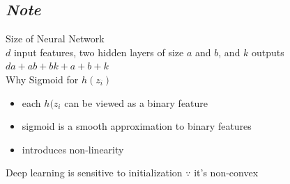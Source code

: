\documentclass[10pt,landscape,a4paper]{article}
\begin{document}
\begin{multicols*}{5}
\subsection{\emph{Note}}
Size of Neural Network \\
\(d\) input features, two hidden layers of size \(a\) and \(b\), and \(k\) outputs \\
\(da+ab+bk+a+b+k\) \\
Why Sigmoid for \(h(z_i)\)
\begin{itemize}
    \item each \(h(z_i\) can be viewed as a binary feature
    \item sigmoid is a smooth approximation to binary features
    \item introduces non-linearity
\end{itemize}
Deep learning is sensitive to initialization \(\because\) it's non-convex


\end{multicols*}
\end{document}
